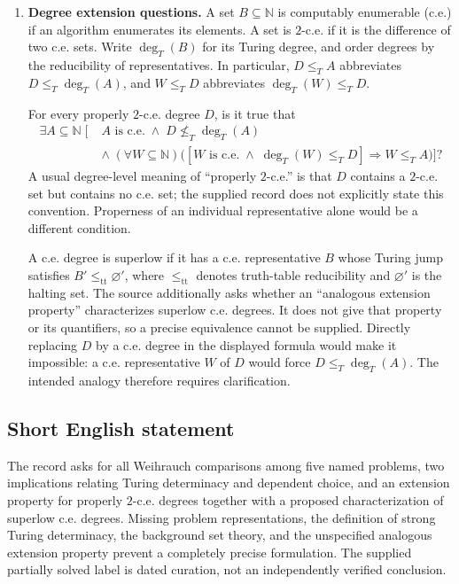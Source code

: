 \documentclass[11pt]{article}
\newcommand{\N}{\mathbb{N}}
\newcommand{\R}{\mathbb{R}}
\begin{document}
\begin{enumerate}
The questions are whether
\[
\mathsf{TD}\Longrightarrow\mathsf{DC}_{\R}
\qquad\text{and}\qquad
\mathsf{TD}+\mathsf{DC}\Longrightarrow\mathsf{sTD},
\]
where \(\mathsf{sTD}\) denotes the source's intended strong Turing determinacy principle. The source supplies neither a definition of \(\mathsf{sTD}\) nor the background set theory over which either implication is asked. The cone formulation and real coding above explain conventional notation; their agreement with the intended source conventions requires review. The second implication retains the source's unqualified dependent choice.

\item \textbf{Degree extension questions.} A set \(B\subseteq\N\) is computably enumerable (c.e.) if an algorithm enumerates its elements. A set is \(2\)-c.e. if it is the difference of two c.e. sets. Write \(\deg_T(B)\) for its Turing degree, and order degrees by the reducibility of representatives. In particular, \(D\leq_T A\) abbreviates \(D\leq_T\deg_T(A)\), and \(W\leq_T D\) abbreviates \(\deg_T(W)\leq_T D\).

For every properly \(2\)-c.e. degree \(D\), is it true that
\[
\begin{aligned}
\exists A\subseteq\N\;\bigl[\;&A\text{ is c.e.}
\;\land\;D\not\leq_T\deg_T(A)\\
&\land\;(\forall W\subseteq\N)\bigl(
[W\text{ is c.e.}\;\land\;\deg_T(W)\leq_T D]
\Longrightarrow W\leq_T A\bigr)\bigr]?
\end{aligned}
\]
A usual degree-level meaning of ``properly \(2\)-c.e.'' is that \(D\) contains a \(2\)-c.e. set but contains no c.e. set; the supplied record does not explicitly state this convention. Properness of an individual representative alone would be a different condition.

A c.e. degree is superlow if it has a c.e. representative \(B\) whose Turing jump satisfies \(B'\leq_{\mathrm{tt}}\varnothing'\), where \(\leq_{\mathrm{tt}}\) denotes truth-table reducibility and \(\varnothing'\) is the halting set. The source additionally asks whether an ``analogous extension property'' characterizes superlow c.e. degrees. It does not give that property or its quantifiers, so a precise equivalence cannot be supplied. Directly replacing \(D\) by a c.e. degree in the displayed formula would make it impossible: a c.e. representative \(W\) of \(D\) would force \(D\leq_T\deg_T(A)\). The intended analogy therefore requires clarification.
\end{enumerate}
\subsection{Short English statement}
The record asks for all Weihrauch comparisons among five named problems, two implications relating Turing determinacy and dependent choice, and an extension property for properly \(2\)-c.e. degrees together with a proposed characterization of superlow c.e. degrees. Missing problem representations, the definition of strong Turing determinacy, the background set theory, and the unspecified analogous extension property prevent a completely precise formulation. The supplied partially solved label is dated curation, not an independently verified conclusion.
\end{document}
